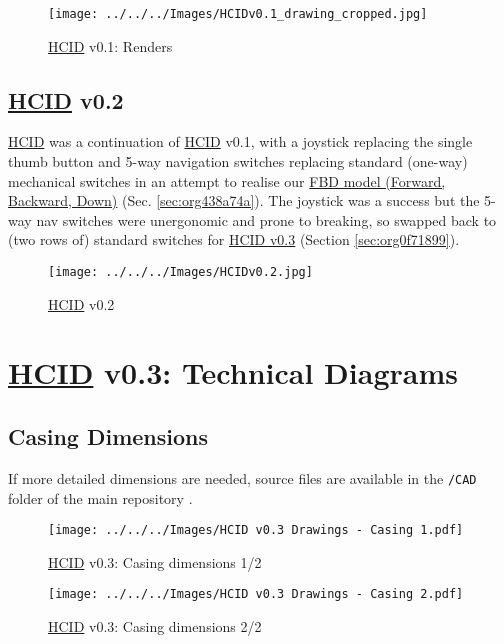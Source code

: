 \documentclass[logo,bsc,singlespacing,parskip]{infthesis}
\begin{document}
\begin{figure}[h]
\centering
\texttt{[image: ../../../Images/HCIDv0.1\_drawing\_cropped.jpg]}
\caption{\hyperref[orgf95a76e]{HCID} v0.1: Renders}
\end{figure}

\section{\hyperref[orgf95a76e]{HCID} v0.2}
\label{sec:org701ba04}
\hyperref[orgf95a76e]{HCID} was a continuation of \hyperref[orgf95a76e]{HCID} v0.1, with a joystick replacing the single thumb button and 5-way navigation switches \autocite{5wayNavigationSwitch} replacing standard (one-way) mechanical switches in an attempt to realise our \hyperref[sec:org438a74a]{FBD model (Forward, Backward, Down)} (Sec. \ref{sec:org438a74a}).
The joystick was a success but the 5-way nav switches were unergonomic and prone to breaking, so swapped back to (two rows of) standard switches for \hyperref[sec:org0f71899]{HCID v0.3} (Section \ref{sec:org0f71899}).

\begin{figure}[h]
\centering
\texttt{[image: ../../../Images/HCIDv0.2.jpg]}
\caption{\hyperref[orgf95a76e]{HCID} v0.2}
\end{figure}

\chapter{\hyperref[orgf95a76e]{HCID} v0.3: Technical Diagrams}
\label{sec:orgf13a7d6}
\section{Casing Dimensions}
\label{sec:org787bdc2}
If more detailed dimensions are needed, source files are available in the \texttt{/CAD} folder of the main repository \autocite{sharpNazzacodeHCIDMy}.

\begin{landscape}
\begin{figure}[htbp]
\centering
\texttt{[image: ../../../Images/HCID v0.3 Drawings - Casing 1.pdf]}
\caption{\hyperref[orgf95a76e]{HCID} v0.3: Casing dimensions 1/2}
\end{figure}
\end{landscape}

\begin{landscape}
\begin{figure}[htbp]
\centering
\texttt{[image: ../../../Images/HCID v0.3 Drawings - Casing 2.pdf]}
\caption{\hyperref[orgf95a76e]{HCID} v0.3: Casing dimensions 2/2}
\end{figure}
\end{landscape}
\restoregeometry
\end{document}
